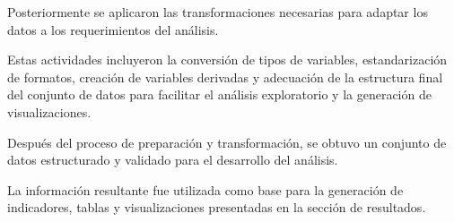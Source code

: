 

Posteriormente se aplicaron las transformaciones necesarias para adaptar los datos a los requerimientos del análisis.

Estas actividades incluyeron la conversión de tipos de variables, estandarización de formatos, creación de variables derivadas y adecuación de la estructura final del conjunto de datos para facilitar el análisis exploratorio y la generación de visualizaciones.





Después del proceso de preparación y transformación, se obtuvo un conjunto de datos estructurado y validado para el desarrollo del análisis.

La información resultante fue utilizada como base para la generación de indicadores, tablas y visualizaciones presentadas en la sección de resultados.